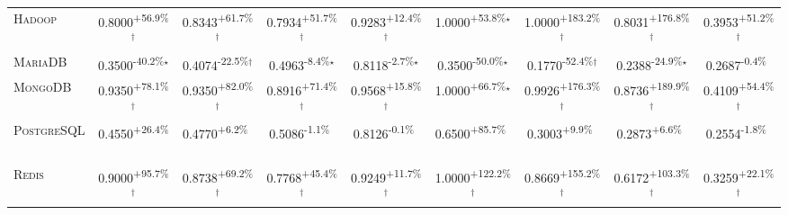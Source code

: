 \begin{table}[htbp]
\begin{tabular}{l|cccc|cccc}
\textsc{Hadoop} & \cellcolor{green!30}0.8000\textsuperscript{+56.9\%}$^\dagger$ & \cellcolor{green!30}0.8343\textsuperscript{+61.7\%}$^\dagger$ & \cellcolor{green!30}0.7934\textsuperscript{+51.7\%}$^\dagger$ & \cellcolor{green!30}0.9283\textsuperscript{+12.4\%}$^\dagger$ & \cellcolor{green!30}1.0000\textsuperscript{+53.8\%}$^\star$ & \cellcolor{green!30}1.0000\textsuperscript{+183.2\%}$^\dagger$ & \cellcolor{green!30}0.8031\textsuperscript{+176.8\%}$^\dagger$ & \cellcolor{green!30}0.3953\textsuperscript{+51.2\%}$^\dagger$ \\
\textsc{MariaDB} & \cellcolor{red!30}0.3500\textsuperscript{-40.2\%}$^\star$ & \cellcolor{red!30}0.4074\textsuperscript{-22.5\%}$^\dagger$ & \cellcolor{red!30}0.4963\textsuperscript{-8.4\%}$^\star$ & \cellcolor{red!30}0.8118\textsuperscript{-2.7\%}$^\star$ & \cellcolor{red!30}0.3500\textsuperscript{-50.0\%}$^\star$ & \cellcolor{red!30}0.1770\textsuperscript{-52.4\%}$^\dagger$ & \cellcolor{red!30}0.2388\textsuperscript{-24.9\%}$^\star$ & \cellcolor{red!30}0.2687\textsuperscript{-0.4\%}$^{\,\,\,}$ \\
\textsc{MongoDB} & \cellcolor{green!30}0.9350\textsuperscript{+78.1\%}$^\dagger$ & \cellcolor{green!30}0.9350\textsuperscript{+82.0\%}$^\dagger$ & \cellcolor{green!30}0.8916\textsuperscript{+71.4\%}$^\dagger$ & \cellcolor{green!30}0.9568\textsuperscript{+15.8\%}$^\dagger$ & \cellcolor{green!30}1.0000\textsuperscript{+66.7\%}$^\star$ & \cellcolor{green!30}0.9926\textsuperscript{+176.3\%}$^\dagger$ & \cellcolor{green!30}0.8736\textsuperscript{+189.9\%}$^\dagger$ & \cellcolor{green!30}0.4109\textsuperscript{+54.4\%}$^\dagger$ \\
\textsc{PostgreSQL} & \cellcolor{green!30}0.4550\textsuperscript{+26.4\%}$^{\,\,\,}$ & \cellcolor{green!30}0.4770\textsuperscript{+6.2\%}$^{\,\,\,}$ & \cellcolor{red!30}0.5086\textsuperscript{-1.1\%}$^{\,\,\,}$ & \cellcolor{red!30}0.8126\textsuperscript{-0.1\%}$^{\,\,\,}$ & \cellcolor{green!30}0.6500\textsuperscript{+85.7\%}$^{\,\,\,}$ & \cellcolor{green!30}0.3003\textsuperscript{+9.9\%}$^{\,\,\,}$ & \cellcolor{green!30}0.2873\textsuperscript{+6.6\%}$^{\,\,\,}$ & \cellcolor{red!30}0.2554\textsuperscript{-1.8\%}$^{\,\,\,}$ \\
\textsc{Redis} & \cellcolor{green!30}0.9000\textsuperscript{+95.7\%}$^\dagger$ & \cellcolor{green!30}0.8738\textsuperscript{+69.2\%}$^\dagger$ & \cellcolor{green!30}0.7768\textsuperscript{+45.4\%}$^\dagger$ & \cellcolor{green!30}0.9249\textsuperscript{+11.7\%}$^\dagger$ & \cellcolor{green!30}1.0000\textsuperscript{+122.2\%}$^\dagger$ & \cellcolor{green!30}0.8669\textsuperscript{+155.2\%}$^\dagger$ & \cellcolor{green!30}0.6172\textsuperscript{+103.3\%}$^\dagger$ & \cellcolor{green!30}0.3259\textsuperscript{+22.1\%}$^\dagger$ \\

\end{tabular}
\end{table}
